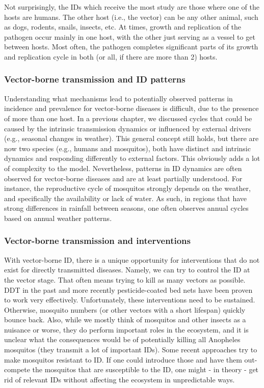 \documentclass[]{article}
\theoremstyle{definition}
\theoremstyle{definition}
\theoremstyle{definition}
\theoremstyle{remark}
\begin{document}
Not surprisingly, the IDs which receive the most study are those where
one of the hosts are humans. The other host (i.e., the vector) can be
any other animal, such as dogs, rodents, snails, insects, etc. At times,
growth and replication of the pathogen occur mainly in one host, with
the other just serving as a vessel to get between hosts. Most often, the
pathogen completes significant parts of its growth and replication cycle
in both (or all, if there are more than 2) hosts.

\subsubsection{Vector-borne transmission and ID
patterns}\label{vector-borne-transmission-and-id-patterns}

Understanding what mechanisms lead to potentially observed patterns in
incidence and prevalence for vector-borne diseases is difficult, due to
the presence of more than one host. In a previous chapter, we discussed
cycles that could be caused by the intrinsic transmission dynamics or
influenced by external drivers (e.g., seasonal changes in weather). This
general concept still holds, but there are now two species (e.g., humans
and mosquitos), both have distinct and intrinsic dynamics and responding
differently to external factors. This obviously adds a lot of complexity
to the model. Nevertheless, patterns in ID dynamics are often observed
for vector-borne diseases and are at least partially understood. For
instance, the reproductive cycle of mosquitos strongly depends on the
weather, and specifically the availability or lack of water. As such, in
regions that have strong differences in rainfall between seasons, one
often observes annual cycles based on annual weather patterns.

\subsubsection{Vector-borne transmission and
interventions}\label{vector-borne-transmission-and-interventions}

With vector-borne ID, there is a unique opportunity for interventions
that do not exist for directly transmitted diseases. Namely, we can try
to control the ID at the vector stage. That often means trying to kill
as many vectors as possible. DDT in the past and more recently
pesticide-coated bed nets have been proven to work very effectively.
Unfortunately, these interventions need to be sustained. Otherwise,
mosquito numbers (or other vectors with a short lifespan) quickly bounce
back. Also, while we mostly think of mosquitos and other insects as a
nuisance or worse, they do perform important roles in the ecosystem, and
it is unclear what the consequences would be of potentially killing all
Anopheles mosquitos (they transmit a lot of important IDs). Some recent
approaches try to make mosquitos resistant to ID. If one could introduce
those and have them out-compete the mosquitos that are susceptible to
the ID, one might - in theory - get rid of relevant IDs without
affecting the ecosystem in unpredictable ways.
\end{document}
